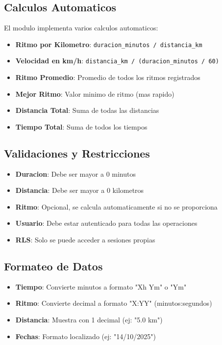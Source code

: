 \documentclass[12pt,a4paper]{article}
\begin{document}
\subsection{Calculos Automaticos}

El modulo implementa varios calculos automaticos:

\begin{itemize}
    \item \textbf{Ritmo por Kilometro}: \texttt{duracion\_minutos / distancia\_km}
    \item \textbf{Velocidad en km/h}: \texttt{distancia\_km / (duracion\_minutos / 60)}
    \item \textbf{Ritmo Promedio}: Promedio de todos los ritmos registrados
    \item \textbf{Mejor Ritmo}: Valor minimo de ritmo (mas rapido)
    \item \textbf{Distancia Total}: Suma de todas las distancias
    \item \textbf{Tiempo Total}: Suma de todos los tiempos
\end{itemize}

\subsection{Validaciones y Restricciones}

\begin{itemize}
    \item \textbf{Duracion}: Debe ser mayor a 0 minutos
    \item \textbf{Distancia}: Debe ser mayor a 0 kilometros
    \item \textbf{Ritmo}: Opcional, se calcula automaticamente si no se proporciona
    \item \textbf{Usuario}: Debe estar autenticado para todas las operaciones
    \item \textbf{RLS}: Solo se puede acceder a sesiones propias
\end{itemize}

\subsection{Formateo de Datos}

\begin{itemize}
    \item \textbf{Tiempo}: Convierte minutos a formato "Xh Ym" o "Ym"
    \item \textbf{Ritmo}: Convierte decimal a formato "X:YY" (minutos:segundos)
    \item \textbf{Distancia}: Muestra con 1 decimal (ej: "5.0 km")
    \item \textbf{Fechas}: Formato localizado (ej: "14/10/2025")
\end{itemize}
\end{document}
